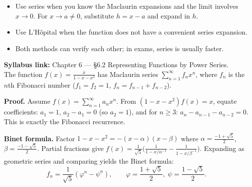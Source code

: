 \begin{examtip}[title={Exam Focus: series limits vs L'H\^{o}pital}]
\begin{itemize}[leftmargin=*]
\item Use series when you know the Maclaurin expansions and the limit involves $x\to 0$.
For $x\to a\neq 0$, substitute $h=x-a$ and expand in $h$.
\item Use L'H\^{o}pital when the function does not have a convenient series expansion.
\item Both methods can verify each other; in exams, series is usually faster.
\end{itemize}
\end{examtip}

\begin{extension}[title={Extension (Beyond Syllabus: Fibonacci generating function --- Tutorial~12, Q8)}]
\textbf{Syllabus link:} Chapter 6 --- \S6.2 Representing Functions by Power Series.\smallskip\\
The function $f(x)=\frac{x}{1-x-x^2}$ has Maclaurin series $\sum_{n=1}^{\infty}f_n x^n$, where $f_n$ is the $n$th Fibonacci number ($f_1=f_2=1$, $f_n=f_{n-1}+f_{n-2}$).

\smallskip
\textbf{Proof.} Assume $f(x)=\sum_{n=1}^{\infty}a_n x^n$.
From $(1-x-x^2)f(x)=x$, equate coefficients:
$a_1=1$, $a_2-a_1=0$ (so $a_2=1$), and for $n\ge 3$: $a_n-a_{n-1}-a_{n-2}=0$.
This is exactly the Fibonacci recurrence.

\smallskip
\textbf{Binet formula.} Factor $1-x-x^2=-(x-\alpha)(x-\beta)$ where $\alpha=\frac{-1+\sqrt5}{2}$, $\beta=\frac{-1-\sqrt5}{2}$.
Partial fractions give $f(x)=\frac{1}{\sqrt5}\bigl(\frac{1}{1-x/\alpha^{-1}}-\frac{1}{1-x/\beta^{-1}}\bigr)$.
Expanding as geometric series and comparing yields the Binet formula:
\[
f_n=\frac{1}{\sqrt5}\left(\varphi^n-\psi^n\right),
\qquad \varphi=\frac{1+\sqrt5}{2},\;\psi=\frac{1-\sqrt5}{2}.
\]
\end{extension}


